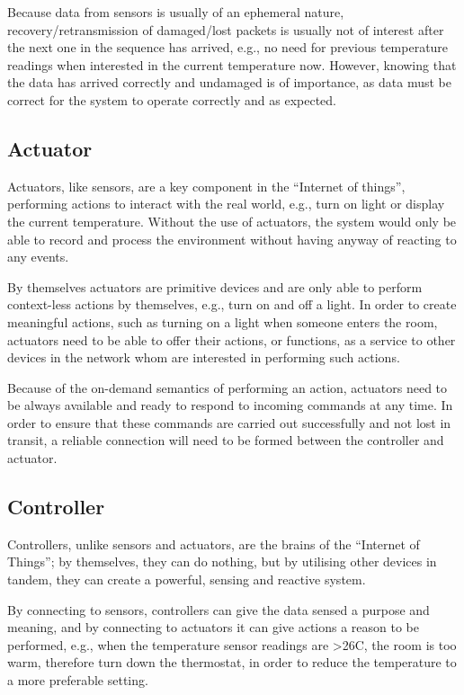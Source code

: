 Because data from sensors is usually of an ephemeral nature, recovery/retransmission of damaged/lost packets is usually not of interest after the next one in the sequence has arrived, e.g., no need for previous temperature readings when interested in the current temperature now. However, knowing that the data has arrived correctly and undamaged is of importance, as data must be correct for the system to operate correctly and as expected.

\subsection{Actuator} %
\label{sub:actuator}
Actuators, like sensors, are a key component in the ``Internet of things'', performing actions to interact with the real world, e.g., turn on light or display the current temperature. Without the use of actuators, the system would only be able to record and process the environment without having anyway of reacting to any events.

By themselves actuators are primitive devices and are only able to perform context-less actions by themselves, e.g., turn on and off a light. In order to create meaningful actions, such as turning on a light when someone enters the room, actuators need to be able to offer their actions, or functions, as a service to other devices in the network whom are interested in performing such actions.

Because of the on-demand semantics of performing an action, actuators need to be always available and ready to respond to incoming commands at any time. In order to ensure that these commands are carried out successfully and not lost in transit, a reliable connection will need to be formed between the controller and actuator.

\subsection{Controller} %
\label{sub:controller}
Controllers, unlike sensors and actuators, are the brains of the ``Internet of Things''; by themselves, they can do nothing, but by utilising other devices in tandem, they can create a powerful, sensing and reactive system. 

By connecting to sensors, controllers can give the data sensed a purpose and meaning, and by connecting to actuators it can give actions a reason to be performed, e.g., when the temperature sensor readings are \textgreater 26C, the room is too warm, therefore turn down the thermostat, in order to reduce the temperature to a more preferable setting. 

